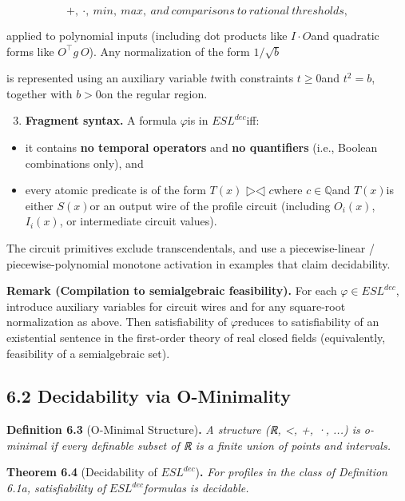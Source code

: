 \documentclass[12pt]{article}
\theoremstyle{plain}
\theoremstyle{definition}
\theoremstyle{remark}
\begin{document}
\[+ ,\  \cdot ,\ min,\ max,\ and\ comparisons\ to\ rational\ thresholds,\]

applied to polynomial inputs (including dot products like
\(I \cdot O\)and quadratic forms like \(O^{\top}g\text{ }O\)). Any
normalization of the form \(1/\sqrt{b}\)

is represented using an auxiliary variable \(t\)with constraints
\(t \geq 0\)and \(t^{2} = b\), together with \(b > 0\)on the regular
region.

\begin{enumerate}
\setcounter{enumi}{2}
\item
  \textbf{Fragment syntax.} A formula \(\varphi\)is in
  \({ESL}^{dec}\)iff:
\end{enumerate}

\begin{itemize}
\item
  it contains \textbf{no temporal operators} and \textbf{no quantifiers}
  (i.e., Boolean combinations only), and
\item
  every atomic predicate is of the form \(T(x)\text{ ▷◁ }c\)where
  \(c \in \mathbb{Q}\)and \(T(x)\)is either \(S(x)\)or an output wire of
  the profile circuit (including \(O_{i}(x)\), \(I_{i}(x)\), or
  intermediate circuit values).
\end{itemize}

The circuit primitives exclude transcendentals, and use a
piecewise-linear / piecewise-polynomial monotone activation in examples
that claim decidability.

\textbf{Remark (Compilation to semialgebraic feasibility).} For each
\(\varphi \in {ESL}^{dec}\), introduce auxiliary variables for circuit
wires and for any square-root normalization as above. Then
satisfiability of \(\varphi\)reduces to satisfiability of an existential
sentence in the first-order theory of real closed fields (equivalently,
feasibility of a semialgebraic set).

\subsection{6.2 Decidability via
O-Minimality}\label{decidability-via-o-minimality}

\textbf{Definition 6.3} (O-Minimal Structure)\textbf{.} \emph{A
structure (ℝ, \textless, +, ·, ...) is o-minimal if every definable
subset of ℝ is a finite union of points and intervals.}

\textbf{Theorem 6.4} (Decidability of \({ESL}^{dec}\))\textbf{.}
\emph{For profiles in the class of Definition 6.1a, satisfiability of}
\({ESL}^{dec}\)\emph{formulas is decidable.}
\end{document}
